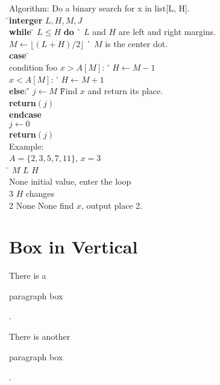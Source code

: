 \documentclass{article}
\begin{document}
        \newcommand\kw{\textbf}
        \begin{tabbing}
            
            \pushtabs
            Algorithm: Do a binary search for x in list[L, H]. \\
            \qquad\=\+\kw{interger} $L, H, M, J$\\
            \kw{while} \=\+ $L \leq H$ \kw{do} \` $L$ and $H$ are left and right margins. \\
                $M \gets \lfloor(L+H)/2\rfloor$ \` $M$ is the center dot. \\
                \kw{case} \=\+\\
                    condition \= foo \+\kill
                    $x > A[M]$: \' $H \gets M-1$ \\
                    $x < A[M]$: \' $H \gets M+1$ \\
                    \kw{else}: \' \= $j \gets M$ \` Find $x$ and return its place. \\
                        \> \kw{return}$(j)$ \\
                \<\< \kw{endcase} \-\-\-\\
            $j \gets 0$\\
            \kw{return}$(j)$ \-\\
            \poptabs
            Example: \\
            $A = \{2, 3, 5, 7, 11\}$, $x = 3$\\
            \qquad\=\+ $M$\qquad \= $L$\qquad \= $H$\qquad \= \\
                        None                        \> initial value, enter the loop \\
                        3                           \> $H$ changes \\
                        2        \> None      \> None       \> find $x$, output place 2. 
        \end{tabbing}

    \section{Box in Vertical} 
        There is a \parbox{4em}{paragraph box}. \par
        There is another 
        \begin{minipage}{4em}
            paragraph box
        \end{minipage}. 
\end{document}
